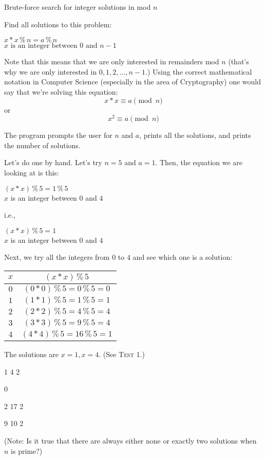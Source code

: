 Brute-force search for integer solutions in mod $n$

Find all solutions to this problem:
\begin{center}
$x * x\,\%\,n = a\,\%\,n$ \\
$x \text{ is an integer between } 0 \text{ and } n - 1$
\end{center}

Note that this means that we are only interested in remainders mod $n$
(that's why we are only interested in $0, 1, 2, \dots, n - 1$.) Using the
correct mathematical notation in Computer Science (especially in the area of
Cryptography) one would say that we're solving this equation:
\[x * x \equiv a \pmod n\]
or
\[x^2 \equiv a \pmod n\]

The program prompts the user for $n$ and $a$, prints all the solutions, and
prints the number of solutions. 

Let's do one by hand. Let's try $n = 5$ and $a = 1$. Then, the equation we are
looking at is this:
\begin{center}
$(x * x)\,\%\,5 = 1\,\%\,5$ \\
$x$ is an integer between $0$ and $4$
\end{center}
i.e.,
\begin{center}
$(x * x)\,\%\,5 = 1$ \\
$x$ is an integer between $0$ and $4$
\end{center}

Next, we try all the integers from $0$ to $4$ and see which one is a solution:
\begin{longtable}{|c|c|} \hline
$x$ & $(x * x)\,\%\,5$ \\ \hline
$0$ & $(0 * 0)\,\%\,5 = 0\,\%\,5 = 0$ \\ \hline
$1$ & $(1 * 1)\,\%\,5 = 1\,\%\,5 = 1$ \\ \hline
$2$ & $(2 * 2)\,\%\,5 = 4\,\%\,5 = 4$ \\ \hline
$3$ & $(3 * 3)\,\%\,5 = 9\,\%\,5 = 4$ \\ \hline
$4$ & $(4 * 4)\,\%\,5 = 16\,\%\,5 = 1$ \\ \hline
\end{longtable}
The solutions are $x = 1, x = 4$. (See \textsc{Test 1}.)

\resett
\nextt
\begin{console}[commandchars=\\\{\}]
1 4
2
\end{console}

\nextt
\begin{console}[commandchars=\\\{\}]

0
\end{console}

\nextt
\begin{console}[commandchars=\\\{\}]
2 17
2
\end{console}

\nextt
\begin{console}[commandchars=\\\{\}]
9 10
2
\end{console}
(Note: Is it true that there are always either none or exactly two solutions
when $n$ is prime?)
